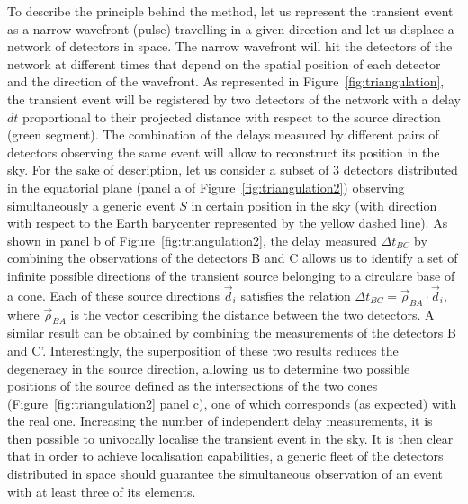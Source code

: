 \documentclass[]{spie}  %
\begin{document}
To describe the principle behind the method, let us represent the transient event as a narrow wavefront (pulse) travelling in a given direction and let us displace a network of detectors in space. The narrow wavefront will hit the detectors of the network at different times that depend on the spatial position of each detector and the direction of the wavefront. As represented in Figure~\ref{fig:triangulation}, the transient event will be registered by two detectors of the network with a delay $dt$ proportional to their projected distance with respect to the source direction (green segment). The combination of the delays measured by different pairs of detectors observing the same event will allow to reconstruct its position in the sky. For the sake of description, let us consider a subset of 3 detectors distributed in the equatorial plane (panel a of Figure~\ref{fig:triangulation2}) observing simultaneously a generic event $S$ in certain position in the sky (with direction with respect to the Earth barycenter represented by the yellow dashed line). As shown in panel b of Figure~\ref{fig:triangulation2}, the delay measured $\Delta t_{BC}$ by combining the observations of the detectors B and C allows us to identify a set of infinite possible directions of the transient source belonging to a circulare base of a cone. Each of these source directions $\vec{d}_i$ satisfies the relation $\Delta t_{BC}=\vec{\rho}_{BA}\cdot \vec{d}_i$, where $\vec{\rho}_{BA}$ is the vector describing the distance between the two detectors. A similar result can be obtained by combining the measurements of the detectors B and C'. Interestingly, the superposition of these two results reduces the degeneracy in the source direction, allowing us to determine two possible positions of the source defined as the intersections of the two cones (Figure~\ref{fig:triangulation2} panel c), one of which corresponds (as expected) with the real one. Increasing the number of independent delay measurements, it is then possible to univocally localise the transient event in the sky. It is then clear that in order to achieve localisation capabilities, a generic fleet of the detectors distributed in space should guarantee the simultaneous observation of an event with at least three of its elements.    
\end{document}
